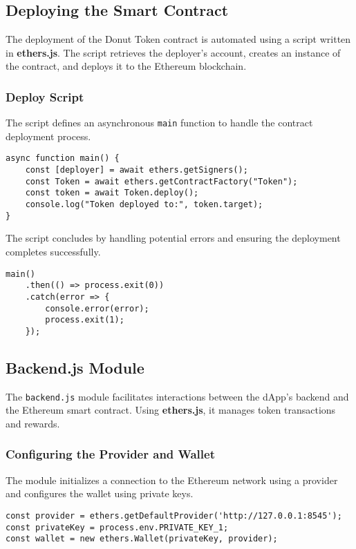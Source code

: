 \documentclass[../main.tex]{subfiles}
\begin{document}

\subsection{Deploying the Smart Contract}
The deployment of the Donut Token contract is automated using a script written in \textbf{ethers.js}. The script retrieves the deployer's account, creates an instance of the contract, and deploys it to the Ethereum blockchain.

\subsubsection{Deploy Script}
The script defines an asynchronous \texttt{main} function to handle the contract deployment process.

\begin{verbatim}
async function main() {
    const [deployer] = await ethers.getSigners();
    const Token = await ethers.getContractFactory("Token");
    const token = await Token.deploy();
    console.log("Token deployed to:", token.target);
}
\end{verbatim}

The script concludes by handling potential errors and ensuring the deployment completes successfully.

\begin{verbatim}
main()
    .then(() => process.exit(0))
    .catch(error => {
        console.error(error);
        process.exit(1);
    });
\end{verbatim}


\subsection{Backend.js Module}
The \texttt{backend.js} module facilitates interactions between the dApp's backend and the Ethereum smart contract. Using \textbf{ethers.js}, it manages token transactions and rewards.

\subsubsection{Configuring the Provider and Wallet}
The module initializes a connection to the Ethereum network using a provider and configures the wallet using private keys.

\begin{verbatim}
const provider = ethers.getDefaultProvider('http://127.0.0.1:8545');
const privateKey = process.env.PRIVATE_KEY_1;
const wallet = new ethers.Wallet(privateKey, provider);
\end{verbatim}
\end{document}
